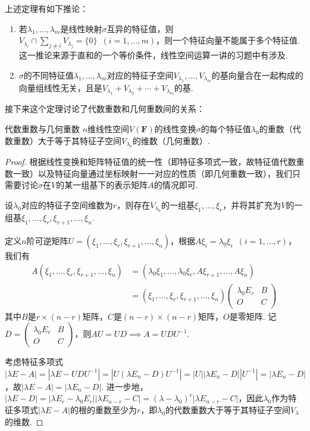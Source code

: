上述定理有如下推论：
\begin{enumerate}
    \item 若$\lambda_1,\ldots,\lambda_m$是线性映射$\sigma$互异的特征值，则$V_{\lambda_i}\cap\sum\limits_{j\neq i}V_{\lambda_j}=\{0\}
              \enspace(i=1,\ldots,m)$，则一个特征向量不能属于多个特征值. 这一推论来源于直和的一个等价条件，线性空间运算一讲的习题中有涉及.

    \item $\sigma$的不同特征值$\lambda_1,\ldots,\lambda_m$对应的特征子空间$V_{\lambda_1},\ldots,V_{\lambda_m}$的基向量合在一起构成的向量组线性无关，且是$V_{\lambda_1}+V_{\lambda_2}+\cdots+V_{\lambda_m}$的基.
\end{enumerate}

接下来这个定理讨论了代数重数和几何重数间的关系：
\begin{theorem}{}{代数重数与几何重数}
    $n$维线性空间$V(\mathbf{F})$的线性变换$\sigma$的每个特征值$\lambda_0$的重数（代数重数）大于等于其特征子空间$V_{\lambda_0}$的维数（几何重数）.
\end{theorem}

\begin{proof}
    根据线性变换和矩阵特征值的统一性（即特征多项式一致，故特征值代数重数一致）以及特征向量通过坐标映射一一对应的性质（即几何重数一致），我们只需要讨论$\sigma$在$V$的某一组基下的表示矩阵$A$的情况即可.

    设$\lambda_0$对应的特征子空间维数为$r$，则存在$V_{\lambda_0}$的一组基$\xi_1,\ldots,\xi_r$，并将其扩充为$V$的一组基$\xi_1,\ldots,\xi_r,\xi_{r+1},\ldots,\xi_n$.

    定义$n$阶可逆矩阵$U=(\xi_1,\ldots,\xi_r,\xi_{r+1},\ldots,\xi_n)$，根据$A\xi_i=\lambda_0\xi_i\enspace(i=1,\ldots,r)$，我们有
    \begin{align*}
        A(\xi_1,\ldots,\xi_r,\xi_{r+1},\ldots,\xi_n) & = (\lambda_0\xi_1,\ldots,\lambda_0\xi_r,A\xi_{r+1},\ldots,A\xi_n) \\
                                                     & = (\xi_1,\ldots,\xi_r,\xi_{r+1},\ldots,\xi_n)
        \begin{pmatrix}
            \lambda_0 E_r & B \\ O & C
        \end{pmatrix}
    \end{align*}
    其中$B$是$r\times(n-r)$矩阵，$C$是$(n-r)\times(n-r)$矩阵，$O$是零矩阵. 记$D=\begin{pmatrix}
            \lambda_0 E_r & B \\ O & C
        \end{pmatrix}$，则$AU=UD\implies A=UDU^{-1}$.

    考虑特征多项式$|\lambda E-A|=|\lambda E-UDU^{-1}|=|U(\lambda E_n-D)U^{-1}|=|U||\lambda E_n-D||U^{-1}|=|\lambda E_n-D|$，故$|\lambda E-A|=|\lambda E_n-D|$. 进一步地，$|\lambda E-D|=|\lambda E_r-\lambda_0 E_r||\lambda E_{n-r}-C|=(\lambda-\lambda_0)^r|\lambda E_{n-r}-C|$，因此$\lambda_0$作为特征多项式$|\lambda E-A|$的根的重数至少为$r$，即$\lambda_0$的代数重数大于等于其特征子空间$V_{\lambda}$的维数.
\end{proof}

